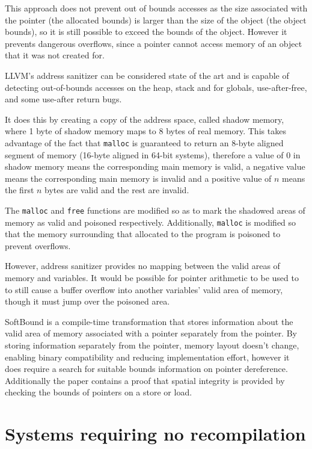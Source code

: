 This approach does not prevent out of bounds accesses as the size associated with the pointer (the allocated bounds) is larger than the size of the object (the object bounds), so it is still possible to exceed the bounds of the object.
However it prevents dangerous overflows, since a pointer cannot access memory of an object that it was not created for.

LLVM's address sanitizer \cite{llvmAddrSan, llvmAddrSanAlgo} can be considered state of the art and  is capable of detecting out-of-bounds accesses on the heap, stack and for globals, use-after-free, and some use-after return bugs.

It does this by creating a copy of the address space, called shadow memory, where 1 byte of shadow memory maps to 8 bytes of real memory.
This takes advantage of the fact that \verb!malloc! is guaranteed to return an 8-byte aligned segment of memory (16-byte aligned in 64-bit systems), therefore a value of 0 in shadow memory means the corresponding main memory is valid, a negative value means the corresponding main memory is invalid and a positive value of $n$ means the first $n$ bytes are valid and the rest are invalid.

The \verb!malloc! and \verb!free! functions are modified so as to mark the shadowed areas of memory as valid and poisoned respectively.
Additionally, \verb!malloc! is modified so that the memory surrounding that allocated to the program is poisoned to prevent overflows.

However, address sanitizer provides no mapping between the valid areas of memory and variables.
It would be possible for pointer arithmetic to be used to to still cause a buffer overflow into another variables' valid area of memory, though it must jump over the poisoned area.

SoftBound \cite{nagarakatte2009softbound} is a compile-time transformation that stores information about the valid area of memory associated with a pointer separately from the pointer.
By storing information separately from the pointer, memory layout doesn't change, enabling binary compatibility and reducing implementation effort, however it does require a search for suitable bounds information on pointer dereference.
Additionally the paper contains a proof that spatial integrity is provided by checking the bounds of pointers on a store or load.

\section{Systems requiring no recompilation}

